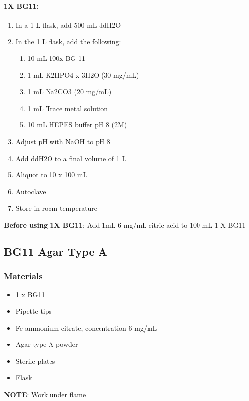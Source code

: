 \paragraph{1X BG11:}
\begin{enumerate}
    \item In a 1 L flask, add 500 mL ddH2O
    \item In the 1 L flask, add the following:
    \begin{enumerate}
        \item 10 mL 		100x BG-11 				
        \item 1 mL 		K2HPO4 x 3H2O (30 mg/mL) 		
        \item 1 mL 		Na2CO3 (20 mg/mL) 			
        \item 1 mL 		Trace metal solution 			
        \item 10 mL 		HEPES buffer pH 8 (2M) 	
\end{enumerate}
\item Adjust pH with NaOH to pH 8 
\item Add ddH2O to a final volume of 1 L
\item Aliquot to 10 x 100 mL 
\item Autoclave
\item Store in room temperature 
\end{enumerate}

\textbf{Before using 1X BG11}: Add 1mL 6 mg/mL citric acid to 100 mL 1 X BG11 

\pagebreak

\subsection{BG11 Agar Type A} 
\subsubsection{Materials}
\begin{itemize}
    \item 1 x BG11 
    \item Pipette tips
    \item Fe-ammonium citrate, concentration 6 mg/mL
    \item Agar type A powder
    \item Sterile plates 
    \item Flask
\end{itemize}

\textbf{NOTE}: Work under flame

